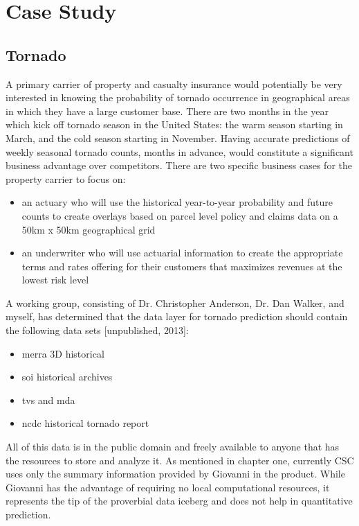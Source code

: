 

\chapter{Case Study}
\section*{Tornado}
A primary carrier of property and casualty insurance would potentially be very interested in knowing the probability of tornado occurrence in geographical areas in which they have a large customer base. There are two months in the year which kick off tornado season in the United States: the warm season starting in March, and the cold season starting in November. Having accurate predictions of weekly seasonal tornado counts, months in advance, would constitute a significant business advantage over competitors. There are two specific business cases for the property carrier to focus on:
\begin{itemize}
    \item an actuary who will use the historical year-to-year probability and future counts to create overlays based on parcel level policy and claims data on a 50km x 50km geographical grid
    \item an underwriter who will use actuarial information to create the appropriate terms and rates offering for their customers that maximizes revenues at the lowest risk level
\end{itemize}
A working group, consisting of Dr. Christopher Anderson, Dr. Dan Walker, and myself, has determined that the data layer for tornado prediction should contain the following data sets [unpublished, 2013]:
\begin{itemize}
    \item \gls{merra} 3D historical\cite{mdisc}
    \item \gls{soi} historical archives\cite{bom}
    \item \gls{tvs} and \gls{mda}\cite{hdss} 
    \item \gls{ncdc} historical tornado report\cite{ncdc}
\end{itemize}
All of this data is in the public domain and freely available to anyone that has the resources to store and analyze it. As mentioned in chapter one, currently CSC uses only the summary information provided by Giovanni in the \climatedge product. While Giovanni has the advantage of requiring no local computational resources, it represents the tip of the proverbial data iceberg and does not help in quantitative prediction.\\

